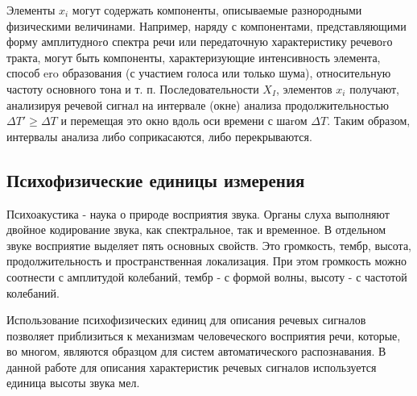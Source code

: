 \documentclass[14pt,russian,utf8,nocolumnsxix]{extarticle}
\begin{document}
Элементы $x_{i}$ могут содержать компоненты, описываемые разнородными физическими величинами. Например, наряду с компонентами, представляющими форму амплитудноrо спектра речи или передаточную характеристику речевоrо тракта, могут быть компоненты, характеризующие интенсивность элемента, способ ero образования (с участием голоса или только шума), относительную частоту основного тона и т. п. 
Последовательности $X_{I}$, элементов $x_{i}$ получают, анализируя речевой сигнал на интервале (окне) анализа продолжительностью $\Delta T'\geq \Delta T$ и перемещая это окно вдоль оси времени с шаrом $\Delta T$. Таким образом, интервалы анализа либо соприкасаются, либо перекрываются. \cite{vincuk}

\subsection{Психофизические единицы измерения}
Психоакустика - наука о природе восприятия звука. 
Органы слуха выполняют двойное кодирование звука, как спектральное, так и временное.
В отдельном звуке восприятие выделяет пять основных свойств. Это громкость, тембр, высота, продолжительность и пространственная локализация. При этом громкость можно соотнести с амплитудой колебаний, тембр - с формой волны, высоту - с частотой колебаний.

Использование психофизических единиц для описания речевых сигналов позволяет приблизиться к механизмам человеческого восприятия речи, которые, во многом, являются образцом для систем автоматического распознавания. В данной работе для описания характеристик речевых сигналов используется единица высоты звука мел.
\end{document}
